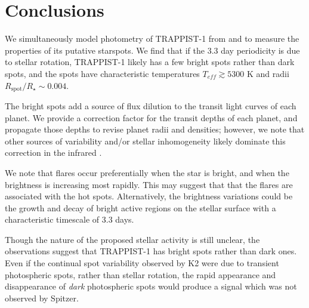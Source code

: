 \section{Conclusions}

We simultaneously model photometry of TRAPPIST-1 from \kepler and \spitzer to measure the properties of its putative starspots. We find that if the 3.3 day periodicity is due to stellar rotation, TRAPPIST-1 likely has a few bright spots rather than dark spots, and the spots have characteristic temperatures $T_{eff} \gtrsim 5300$ K and radii $R_\mathrm{spot}/R_\star \sim 0.004$. 

The bright spots add a source of flux dilution to the transit light curves of each planet. We provide a correction factor for the transit depths of each planet, and propagate those depths to revise planet radii and densities; however, we note that other sources of variability and/or stellar inhomogeneity likely dominate this correction in the infrared \citep{Delrez2018,Zhang2018}.

We note that flares occur preferentially when the star is bright, and when the brightness is increasing most rapidly. This may suggest that that the flares are associated with the hot spots. Alternatively, the brightness variations could be the growth and decay of bright active regions on the stellar surface with a characteristic timescale of 3.3 days.

Though the nature of the proposed stellar activity is still unclear, the observations suggest that TRAPPIST-1 has bright spots rather than dark ones. Even if the continual spot variability observed by K2 were due to transient photospheric spots, rather than stellar rotation, the rapid appearance and disappearance of \textit{dark} photospheric spots would produce a signal which was not observed by Spitzer. 





